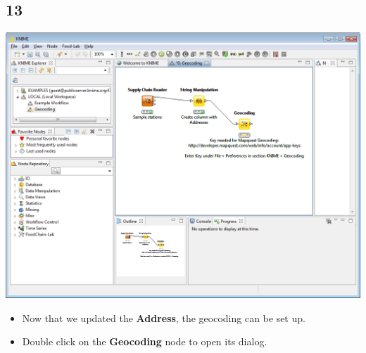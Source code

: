 \documentclass{beamer}
\begin{document}
\subsection{13}
\begin{frame}
	\begin{center}
  		\includegraphics[height=0.6\textheight]{13.png}
	\end{center}
	\begin{itemize}
		\item Now that we updated the \textbf{Address}, the geocoding can be set up.
		\item Double click on the \textbf{Geocoding} node to open its dialog.
	\end{itemize}
\end{frame}
\end{document}
